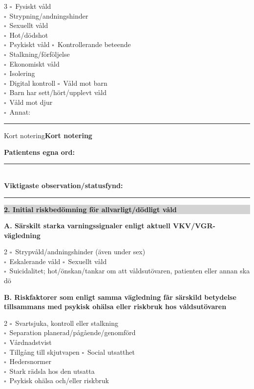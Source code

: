\documentclass[10pt,a4paper]{article}
\newcommand{\cb}{\(\square\)}
\newenvironment{thinbox}[1]{%
  \def\boxtitle{#1}%
  \begin{lrbox}{\legacybox}%
  \begin{minipage}{0.955\linewidth}%
  \ifx\boxtitle\empty\else\textbf{#1}\par\smallskip\fi
}{%
  \end{minipage}%
  \end{lrbox}%
  \par\smallskip\noindent
  \fcolorbox{midgray}{white}{\usebox{\legacybox}}%
  \par\smallskip
}
\newcommand{\sectionbar}[1]{%
  \par\smallskip\noindent
  \colorbox{lightgray}{\parbox{0.965\linewidth}{\bfseries #1}}%
  \par\smallskip
}
\begin{document}
\begin{multicols}{3}
\cb\ Fysiskt våld\\
\cb\ Strypning/andningshinder\\
\cb\ Sexuellt våld\\
\cb\ Hot/dödshot\\
\cb\ Psykiskt våld
\columnbreak
\cb\ Kontrollerande beteende\\
\cb\ Stalkning/förföljelse\\
\cb\ Ekonomiskt våld\\
\cb\ Isolering\\
\cb\ Digital kontroll
\columnbreak
\cb\ Våld mot barn\\
\cb\ Barn har sett/hört/upplevt våld\\
\cb\ Våld mot djur\\
\cb\ Annat: \rule{24mm}{0.32pt}
\end{multicols}

\begin{thinbox}{Kort notering}
\textbf{Patientens egna ord:}\quad \rule{0.72\linewidth}{0.32pt}\\[1.8mm]
\textbf{Viktigaste observation/statusfynd:}\quad \rule{0.61\linewidth}{0.32pt}
\end{thinbox}

\sectionbar{2. Initial riskbedömning för allvarligt/dödligt våld}

\textbf{A. Särskilt starka varningssignaler enligt aktuell VKV/VGR-vägledning}\\
\begin{multicols}{2}
\cb\ Strypvåld/andningshinder (även under sex)\\
\cb\ Eskalerande våld
\columnbreak
\cb\ Sexuellt våld\\
\cb\ Suicidalitet; hot/önskan/tankar om att våldsutövaren, patienten eller annan ska dö
\end{multicols}

\textbf{B. Riskfaktorer som enligt samma vägledning får särskild betydelse tillsammans med psykisk ohälsa eller riskbruk hos våldsutövaren}\\
\begin{multicols}{2}
\cb\ Svartsjuka, kontroll eller stalkning\\
\cb\ Separation planerad/pågående/genomförd\\
\cb\ Vårdnadstvist\\
\cb\ Tillgång till skjutvapen
\columnbreak
\cb\ Social utsatthet\\
\cb\ Hedersnormer\\
\cb\ Stark rädsla hos den utsatta\\
\cb\ Psykisk ohälsa och/eller riskbruk
\end{multicols}
\end{document}
